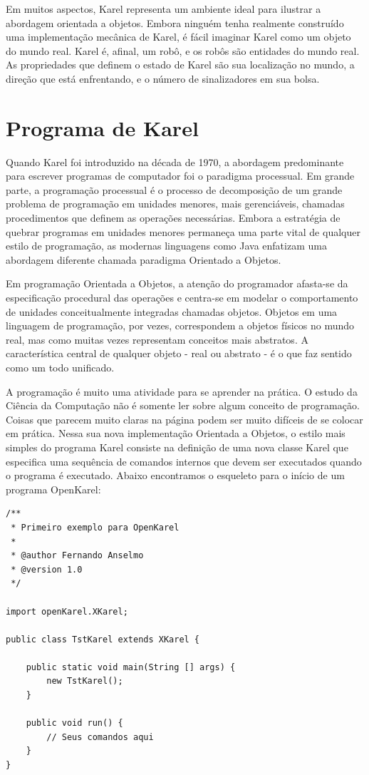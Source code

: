 \documentclass[a4paper,11pt]{article}
\begin{document}
Em muitos aspectos, Karel representa um ambiente ideal para ilustrar a abordagem orientada a objetos. Embora ninguém tenha realmente construído uma  implementação mecânica de Karel, é fácil imaginar Karel como um objeto do mundo real. Karel é, afinal, um robô, e os robôs são entidades do mundo real. As propriedades que definem o estado de Karel são sua localização no mundo, a direção que está enfrentando, e o número de sinalizadores em sua bolsa. 

\section{Programa de Karel}
Quando Karel foi introduzido na década de 1970, a abordagem predominante para escrever programas de computador foi o paradigma processual. Em grande parte, a programação processual é o processo de decomposição de um grande problema de programação em unidades menores, mais gerenciáveis, chamadas procedimentos que definem as operações necessárias. Embora a estratégia de quebrar programas em unidades menores permaneça uma parte vital de qualquer estilo de programação, as modernas linguagens como Java enfatizam uma abordagem diferente chamada paradigma Orientado a Objetos. 

Em programação Orientada a Objetos, a atenção do programador afasta-se da especificação procedural das operações e centra-se em modelar o comportamento de unidades conceitualmente integradas chamadas objetos. Objetos em uma linguagem de programação, por vezes, correspondem a objetos físicos no mundo real, mas como muitas vezes representam conceitos mais abstratos. A característica central de qualquer objeto - real ou abstrato - é o que faz sentido como um todo unificado.

A programação é muito uma atividade para se aprender na prática. O estudo da Ciência da Computação não é somente ler sobre algum conceito de programação. Coisas que parecem muito claras na página podem ser muito difíceis de se colocar em prática. Nessa sua nova implementação Orientada a Objetos, o estilo mais simples do programa Karel consiste na definição de uma nova classe Karel que especifica uma sequência de comandos internos que devem ser executados quando o programa é executado. Abaixo encontramos o esqueleto para o início de um programa OpenKarel:
\begin{lstlisting}
/**
 * Primeiro exemplo para OpenKarel
 * 
 * @author Fernando Anselmo
 * @version 1.0
 */

import openKarel.XKarel;

public class TstKarel extends XKarel {

    public static void main(String [] args) {
        new TstKarel();
    }
    
    public void run() {
        // Seus comandos aqui
    }
}
\end{lstlisting}
\end{document}
